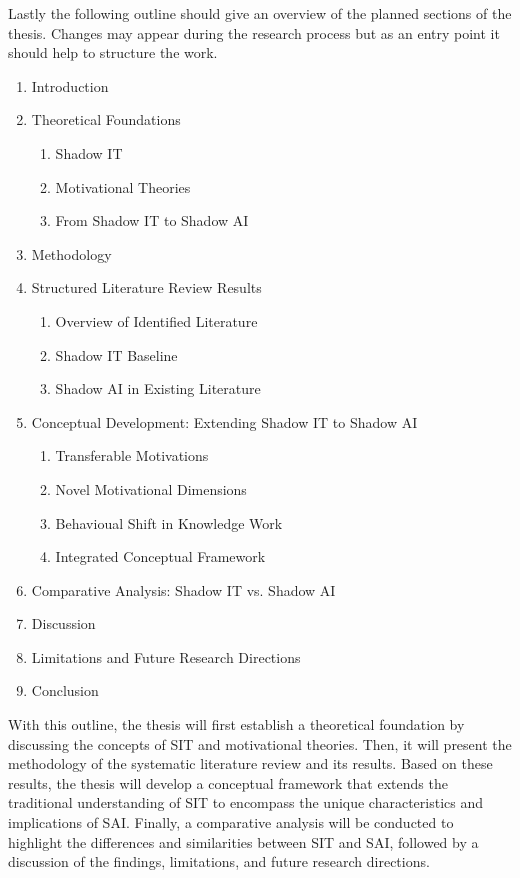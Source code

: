 \documentclass[12pt,oneside]{article}
\begin{document}
Lastly the following outline should give an overview of the planned sections of the thesis. Changes may appear during the research process but as an entry point it should help to structure the work.

\begin{enumerate}
  \item Introduction
  \item Theoretical Foundations
  \begin{enumerate}
    \item Shadow IT
    \item Motivational Theories
    \item From Shadow IT to Shadow AI
  \end{enumerate}
  \item Methodology
  \item Structured Literature Review Results
  \begin{enumerate}
    \item Overview of Identified Literature
    \item Shadow IT Baseline
    \item Shadow AI in Existing Literature
  \end{enumerate}
  \item Conceptual Development: Extending Shadow IT to Shadow AI
  \begin{enumerate}
    \item Transferable Motivations
    \item Novel Motivational Dimensions
    \item Behavioual Shift in Knowledge Work
    \item Integrated Conceptual Framework
  \end{enumerate}
  \item Comparative Analysis: Shadow IT vs. Shadow AI
  \item Discussion
  \item Limitations and Future Research Directions
  \item Conclusion
\end{enumerate}

With this outline, the thesis will first establish a theoretical foundation by discussing the concepts of \ac{SIT} and motivational theories. Then, it will present the methodology of the systematic literature review and its results. Based on these results, the thesis will develop a conceptual framework that extends the traditional understanding of \ac{SIT} to encompass the unique characteristics and implications of \ac{SAI}. Finally, a comparative analysis will be conducted to highlight the differences and similarities between \ac{SIT} and \ac{SAI}, followed by a discussion of the findings, limitations, and future research directions.
\end{document}

